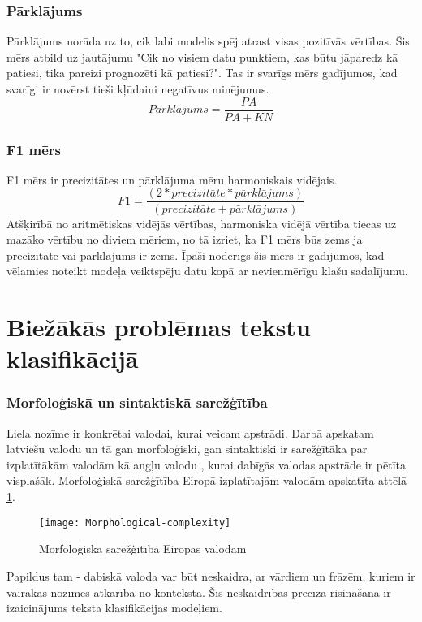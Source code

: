 \subsubsection{Pārklājums}
Pārklājums norāda uz to, cik labi modelis spēj atrast visas pozitīvās vērtības. Šis mērs atbild uz jautājumu "Cik no visiem datu punktiem, kas būtu jāparedz kā patiesi, tika pareizi prognozēti kā patiesi?". Tas ir svarīgs mērs gadījumos, kad svarīgi ir novērst tieši kļūdaini negatīvus minējumus.
\begin{equation}
P\bar{a}rkl\bar{a}jums = \frac{PA}{PA + KN}
\end{equation}
\subsubsection{F1 mērs}
F1 mērs ir precizitātes un pārklājuma mēru harmoniskais vidējais.
\begin{equation}
F1 = \frac{(2 * precizit\bar{a}te * p\bar{a}rkl\bar{a}jums)}{(precizit\bar{a}te + p\bar{a}rkl\bar{a}jums)}
\end{equation}
Atšķirībā no aritmētiskas vidējās vērtības, harmoniska vidējā vērtība tiecas uz mazāko vērtību no diviem mēriem, no tā izriet, ka F1 mērs būs zems ja precizitāte vai pārklājums ir zems. Īpaši noderīgs šis mērs ir gadījumos, kad vēlamies noteikt modeļa veiktspēju datu kopā ar nevienmērīgu klašu sadalījumu.

\section{Biežākās problēmas tekstu klasifikācijā}
\subsubsection{Morfoloģiskā un sintaktiskā sarežģītība}
Liela nozīme ir konkrētai valodai, kurai veicam apstrādi. Darbā apskatam latviešu valodu un tā gan morfoloģiski, gan sintaktiski ir  sarežģītāka par izplatītākām valodām kā angļu valodu \cite{morphologicalComplexity}, kurai dabīgās valodas apstrāde ir pētīta visplašāk. Morfoloģiskā sarežģītība Eiropā izplatītajām valodām apskatīta attēlā \ref{fig:morfologiska_sarezgitiba}.
 \begin{figure}[H]
	\texttt{[image: Morphological-complexity]}
	\caption{Morfoloģiskā sarežģītība Eiropas valodām\cite{morphologicalComplexity}}
	\label{fig:morfologiska_sarezgitiba}
\end{figure}
 
Papildus tam - dabiskā valoda var būt neskaidra, ar vārdiem un frāzēm, kuriem ir vairākas nozīmes atkarībā no konteksta. Šīs neskaidrības precīza risināšana ir izaicinājums teksta klasifikācijas modeļiem.

